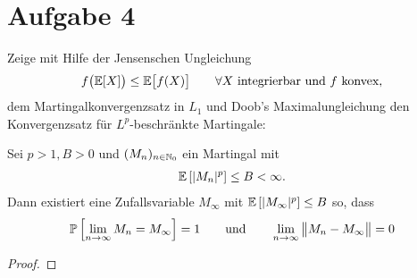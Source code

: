 \documentclass[12pt,a4paper]{article}
\begin{document}
\section*{Aufgabe 4}
Zeige mit Hilfe der Jensenschen Ungleichung
\begin{align}\label{eqJensenscheUngleichung}
f\big(\mathbb{E}[X]\big)\leq\mathbb{E}\big[f(X)\big]\qquad\forall X\text{ integrierbar und $f$ konvex},
\end{align}
dem Martingalkonvergenzsatz in $L_1$ und Doob's Maximalungleichung den Konvergenzsatz für $L^p$-beschränkte Martingale:

\begin{theorem}\enter
Sei $p>1,B>0$ und $(M_n)_{n\in\mathbb{N}_0}$ ein Martingal mit 
\begin{align*}
\mathbb{E}\left[|M_n|^p\right]\leq B<\infty.
\end{align*}
Dann existiert eine Zufallsvariable $M_\infty$ mit $\mathbb{E}\left[|M_\infty|^p\right]\leq B$ so, dass
\begin{align*}
\mathbb{P}\left[\lim\limits_{n\to\infty} M_n=M_\infty\right]=1
\qquad\text{und}\qquad
\lim\limits_{n\to\infty}\big\Vert M_n-M_\infty\big\Vert=0
\end{align*}
\end{theorem}
\begin{proof}

\end{proof}
\end{document}
